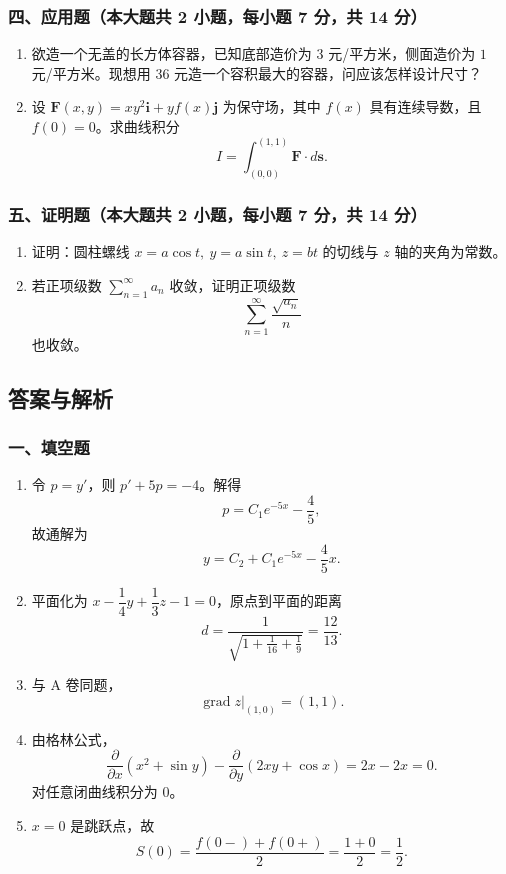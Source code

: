 \subsubsection*{四、应用题（本大题共 2 小题，每小题 7 分，共 14 分）}
\begin{enumerate}
  \item 欲造一个无盖的长方体容器，已知底部造价为 $3$ 元/平方米，侧面造价为 $1$ 元/平方米。现想用 36 元造一个容积最大的容器，问应该怎样设计尺寸？
  \item 设 $\mathbf F(x,y)=xy^2\mathbf i+yf(x)\mathbf j$ 为保守场，其中 $f(x)$ 具有连续导数，且 $f(0)=0$。求曲线积分
  \[
  I=\int_{(0,0)}^{(1,1)}\mathbf F\cdot d\mathbf s.
  \]
\end{enumerate}

\subsubsection*{五、证明题（本大题共 2 小题，每小题 7 分，共 14 分）}
\begin{enumerate}
  \item 证明：圆柱螺线 $x=a\cos t,\ y=a\sin t,\ z=bt$ 的切线与 $z$ 轴的夹角为常数。
  \item 若正项级数 $\displaystyle\sum_{n=1}^{\infty}a_n$ 收敛，证明正项级数
  \[
  \sum_{n=1}^{\infty}\frac{\sqrt{a_n}}{n}
  \]
  也收敛。
\end{enumerate}

\subsection{答案与解析}

\subsubsection*{一、填空题}
\begin{enumerate}
  \item 令 $p=y'$，则 $p'+5p=-4$。解得
  \[
  p=C_1e^{-5x}-\frac45,
  \]
  故通解为
  \[
  y=C_2+C_1e^{-5x}-\frac45x.
  \]
  \item 平面化为 $x-\dfrac14y+\dfrac13z-1=0$，原点到平面的距离
  \[
  d=\frac1{\sqrt{1+\frac1{16}+\frac1{9}}}=\frac{12}{13}.
  \]
  \item 与 A 卷同题，
  \[
  \operatorname{grad}z\big|_{(1,0)}=(1,1).
  \]
  \item 由格林公式，
  \[
  \frac{\partial}{\partial x}(x^2+\sin y)-\frac{\partial}{\partial y}(2xy+\cos x)=2x-2x=0.
  \]
  对任意闭曲线积分为 $0$。
  \item $x=0$ 是跳跃点，故
  \[
  S(0)=\frac{f(0-)+f(0+)}2=\frac{1+0}{2}=\frac12.
  \]
\end{enumerate}

